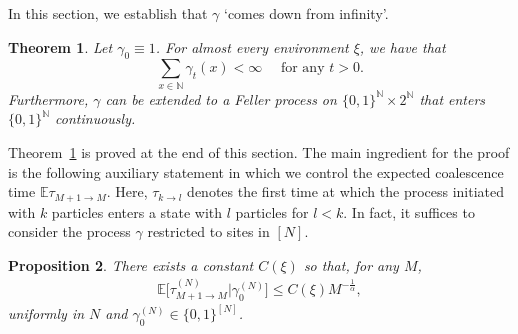 \documentclass[11pt,a4paper]{scrartcl}
\numberwithin{equation}{section}
\theoremstyle{plain}
\newtheorem{theorem}{Theorem}[section]
\newtheorem{proposition}[theorem]{Proposition}
\theoremstyle{definition}
\theoremstyle{remark}
\newcommand{\bE}{\ensuremath{\mathbb{E}}}
\newcommand{\bN}{\ensuremath{\mathbb{N}}}
\newcommand{\bP}{\ensuremath{\mathbb{P}}}
\newcommand{\super}[1]{{(#1)}}
\begin{document}
%
%
%
In this section, we establish that $\gamma$ `comes down from infinity'.
\begin{theorem}\label{thm:comingdown}
Let $\gamma_0\equiv 1$. For almost every environment $\xi$, we have that
\[
\sum_{x\in\bN}\gamma_t(x)<\infty \quad \text{ for any }t>0.
\]
Furthermore, $\gamma$ can be extended to a Feller process on $\{0,1\}^{\bN}\times 2^{\bN}$ that enters $\{0,1\}^{\bN}$ continuously.
\end{theorem}
Theorem~\ref{thm:comingdown} is proved at the end of this section. The main ingredient for the proof is the following auxiliary statement in which we control the expected coalescence time $\bE \tau_{M+1\to M}$. Here, $\tau_{k\rightarrow l}$ denotes the first time at which the process initiated with $k$ particles enters a state with $l$ particles for $l<k$. In fact, it suffices to consider the process $\gamma$ restricted to sites in $[N].$
\begin{proposition}\label{thm:coalescence-time}
	There exists a constant $C(\xi)$ so that, for any $M$,
	\begin{align}
		\bE \big[\tau^\super{N}_{M+1\to M}\big | \gamma_0^{(N)}\big] \leq C(\xi)M^{-\frac1\alpha},
	\end{align}
	uniformly in $N$ and $\gamma_0^{(N)}\in\{0,1\}^{[N]}$.
\end{proposition}
\end{document}

